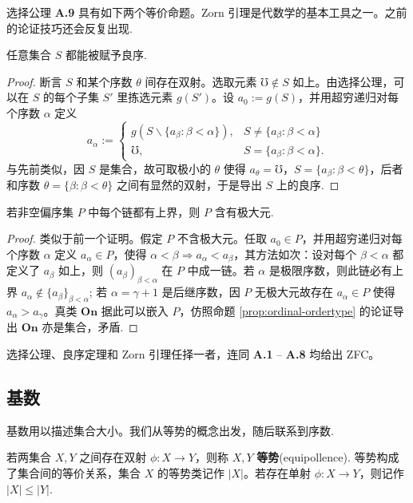 选择公理 \textbf{A.9} 具有如下两个等价命题。Zorn 引理是代数学的基本工具之一。之前的论证技巧还会反复出现.
\begin{theorem}\label{prop:wellorder-principle}
	任意集合 $S$ 都能被赋予良序.
\end{theorem}
\begin{proof}
	断言 $S$ 和某个序数 $\theta$ 间存在双射。选取元素 $\mho \notin S$ 如上。由选择公理，可以在 $S$ 的每个子集 $S'$ 里拣选元素 $g(S')$。设 $a_0 := g(S)$，并用超穷递归对每个序数 $\alpha$ 定义
	\[ a_\alpha := \begin{cases}
		g \left( S \backslash \{ a_\beta : \beta < \alpha \} \right), & S \neq \{ a_\beta : \beta < \alpha \} \\
		\mho, & S = \{ a_\beta : \beta < \alpha \}.
	\end{cases}\]
	与先前类似，因 $S$ 是集合，故可取极小的 $\theta$ 使得 $a_\theta = \mho$，$S = \{a_\beta: \beta < \theta\}$，后者和序数 $\theta = \{\beta : \beta < \theta \}$ 之间有显然的双射，于是导出 $S$ 上的良序.
\end{proof}

\begin{theorem}[Zorn 引理]\label{prop:Zorn}
	若非空偏序集 $P$ 中每个链都有上界，则 $P$ 含有极大元.
\end{theorem}
\begin{proof}
	类似于前一个证明。假定 $P$ 不含极大元。任取 $a_0 \in P$，并用超穷递归对每个序数 $\alpha$ 定义 $a_\alpha \in P$，使得 $\alpha < \beta \Rightarrow a_\alpha < a_\beta$，其方法如次：设对每个 $\beta < \alpha$ 都定义了 $a_\beta$ 如上，则 $(a_\beta)_{\beta < \alpha}$ 在 $P$ 中成一链。若 $\alpha$ 是极限序数，则此链必有上界 $a_\alpha \notin \{ a_\beta \}_{\beta < \alpha}$; 若 $\alpha = \gamma + 1$ 是后继序数，因 $P$ 无极大元故存在 $a_\alpha \in P$ 使得 $a_\alpha > a_\gamma$。真类 $\mathbf{On}$ 据此可以嵌入 $P$，仿照命题 \ref{prop:ordinal-ordertype} 的论证导出 $\mathbf{On}$ 亦是集合，矛盾.
\end{proof}
选择公理、良序定理和 Zorn 引理任择一者，连同 \textbf{A.1} -- \textbf{A.8} 均给出 ZFC。

\subsection{基数}\label{sec:cardinal-number}
基数用以描述集合大小。我们从等势的概念出发，随后联系到序数.

\begin{definition}
	若两集合 $X, Y$ 之间存在双射 $\phi: X \to Y$，则称 $X, Y$ \textbf{等势}(equipollence).
	等势构成了集合间的等价关系，集合 $X$ 的等势类记作 $|X|$。若存在单射 $\phi: X \to Y$，则记作 $|X| \leqslant |Y|$.
\end{definition}

